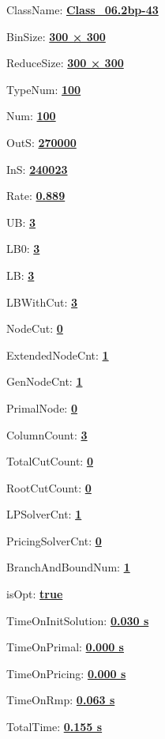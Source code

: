 \documentclass[11pt]{article}
\begin{document}
\pagestyle{empty}


ClassName: \underline{\textbf{Class_06.2bp-43}}
\par
BinSize: \underline{\textbf{300 × 300}}
\par
ReduceSize: \underline{\textbf{300 × 300}}
\par
TypeNum: \underline{\textbf{100}}
\par
Num: \underline{\textbf{100}}
\par
OutS: \underline{\textbf{270000}}
\par
InS: \underline{\textbf{240023}}
\par
Rate: \underline{\textbf{0.889}}
\par
UB: \underline{\textbf{3}}
\par
LB0: \underline{\textbf{3}}
\par
LB: \underline{\textbf{3}}
\par
LBWithCut: \underline{\textbf{3}}
\par
NodeCut: \underline{\textbf{0}}
\par
ExtendedNodeCnt: \underline{\textbf{1}}
\par
GenNodeCnt: \underline{\textbf{1}}
\par
PrimalNode: \underline{\textbf{0}}
\par
ColumnCount: \underline{\textbf{3}}
\par
TotalCutCount: \underline{\textbf{0}}
\par
RootCutCount: \underline{\textbf{0}}
\par
LPSolverCnt: \underline{\textbf{1}}
\par
PricingSolverCnt: \underline{\textbf{0}}
\par
BranchAndBoundNum: \underline{\textbf{1}}
\par
isOpt: \underline{\textbf{true}}
\par
TimeOnInitSolution: \underline{\textbf{0.030 s}}
\par
TimeOnPrimal: \underline{\textbf{0.000 s}}
\par
TimeOnPricing: \underline{\textbf{0.000 s}}
\par
TimeOnRmp: \underline{\textbf{0.063 s}}
\par
TotalTime: \underline{\textbf{0.155 s}}
\par
\newpage
\end{document}
